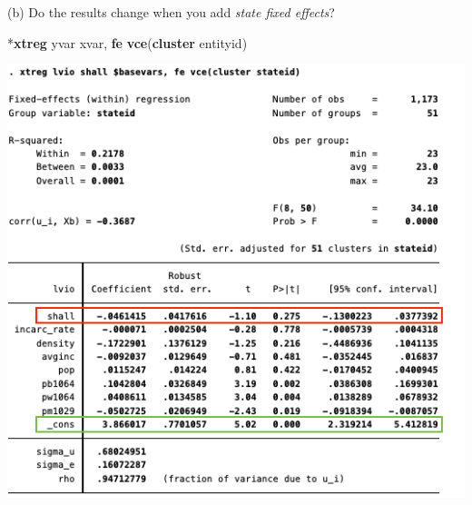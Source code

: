 \documentclass[
  10pt,
  ignorenonframetext,
]{beamer}
\newenvironment{Shaded}{\begin{snugshade}}{\end{snugshade}}
\newcommand{\KeywordTok}[1]{\textcolor[rgb]{0.13,0.29,0.53}{\textbf{#1}}}
\newcommand{\NormalTok}[1]{#1}
\begin{document}
\begin{frame}[fragile]{(b) Do the results change when you add
\emph{state fixed effects}?}
\protect\hypertarget{b-do-the-results-change-when-you-add-state-fixed-effects-1}{}
\footnotesize

\begin{Shaded}
\begin{Highlighting}[]
\NormalTok{*}\KeywordTok{xtreg}\NormalTok{ yvar xvar, }\KeywordTok{fe} \KeywordTok{vce}\NormalTok{(}\KeywordTok{cluster}\NormalTok{ entityid)}
\end{Highlighting}
\end{Shaded}

\begin{flushleft}\includegraphics[width=0.8\linewidth]{pictures/Ex1-EntityFEs} \end{flushleft}
\end{frame}
\end{document}
